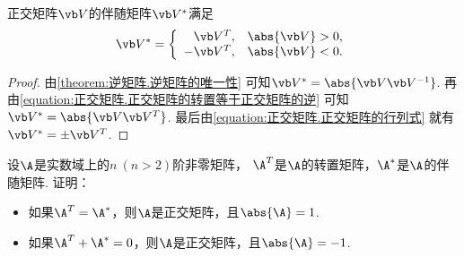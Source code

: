\begin{proposition}
正交矩阵\(\Q\)的伴随矩阵\(\Q^*\)满足\[
	\Q^*
	= \left\{ \begin{array}{rc}
		\Q^T, & \abs{\Q}>0, \\
		-\Q^T, & \abs{\Q}<0.
	\end{array} \right.
\]
\begin{proof}
由\cref{theorem:逆矩阵.逆矩阵的唯一性}
可知\(\Q^* = \abs{\Q \Q^{-1}}\).
再由\cref{equation:正交矩阵.正交矩阵的转置等于正交矩阵的逆}
可知\(\Q^* = \abs{\Q \Q^T}\).
最后由\cref{equation:正交矩阵.正交矩阵的行列式}
就有\(\Q^* = \pm\Q^T\).
\end{proof}
\end{proposition}
\begin{example}
设\(\A\)是实数域上的\(n\ (n>2)\)阶非零矩阵，
\(\A^T\)是\(\A\)的转置矩阵，\(\A^*\)是\(\A\)的伴随矩阵.
证明：\begin{itemize}
	\item 如果\(\A^T=\A^*\)，则\(\A\)是正交矩阵，且\(\abs{\A}=1\).
	\item 如果\(\A^T+\A^*=0\)，则\(\A\)是正交矩阵，且\(\abs{\A}=-1\).
\end{itemize}
\end{example}

